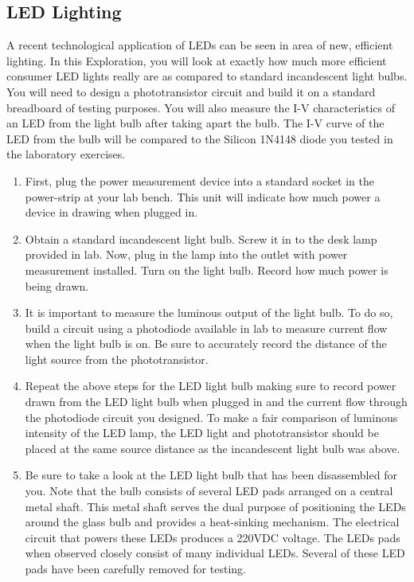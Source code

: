 \documentclass[12pt]{../manual}
\begin{document}
\subsection{LED Lighting}
A recent technological application of LEDs can be seen in area of new, efficient lighting. In this Exploration, you will look at exactly how much more efficient consumer LED lights really are as compared to standard incandescent light bulbs. You will need to design a phototransistor circuit and build it on a standard breadboard of testing purposes. You will also measure the I-V characteristics of an LED from the light bulb after taking apart the bulb. The I-V curve of the LED from the bulb will be compared to the Silicon 1N4148 diode you tested in the laboratory exercises.
\begin{enumerate}
\item First, plug the power measurement device into a standard socket in the power-strip at your lab bench. This unit will indicate how much power a device in drawing when plugged in.
\item Obtain a standard incandescent light bulb. Screw it in to the desk lamp provided in lab. Now, plug in the lamp into the outlet with power measurement installed. Turn on the light bulb. Record how much power is being drawn.
\item It is important to measure the luminous output of the light bulb. To do so, build a circuit using a photodiode available in lab to measure current flow when the light bulb is on. Be sure to accurately record the distance of the light source from the phototransistor.
\item Repeat the above steps for the LED light bulb making sure to record power drawn from the LED light bulb when plugged in and the current flow through the photodiode circuit you designed. To make a fair comparison of luminous intensity of the LED lamp, the LED light and phototransistor should be placed at the same source distance as the incandescent light bulb was above.
\item Be sure to take a look at the LED light bulb that has been disassembled for you. Note that the bulb consists of several LED pads arranged on a central metal shaft. This metal shaft serves the dual purpose of positioning the LEDs around the glass bulb and provides a heat-sinking mechanism. The electrical circuit that powers these LEDs produces a 220VDC voltage. The LEDs pads when observed closely consist of many individual LEDs. Several of these LED pads have been carefully removed for testing.
\end{enumerate}
\end{document}

